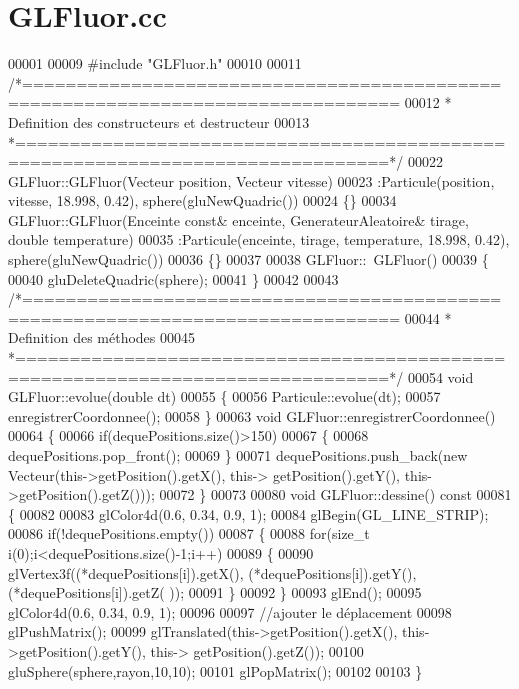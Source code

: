 \section{G\+L\+Fluor.\+cc}
\label{_g_l_fluor_8cc_source}

\begin{DoxyCode}
00001 
00009 \textcolor{preprocessor}{#include "GLFluor.h"}
00010 
00011 \textcolor{comment}{/*================================================================================}
00012 \textcolor{comment}{ * Definition des constructeurs et destructeur}
00013 \textcolor{comment}{ *================================================================================*/}
00022 GLFluor::GLFluor(Vecteur position, Vecteur vitesse)
00023 :Particule(position, vitesse, 18.998, 0.42),  sphere(gluNewQuadric())
00024 \{\}
00034 GLFluor::GLFluor(Enceinte \textcolor{keyword}{const}& enceinte, GenerateurAleatoire& tirage, \textcolor{keywordtype}{double} temperature)
00035 :Particule(enceinte, tirage, temperature, 18.998, 0.42), sphere(gluNewQuadric())
00036 \{\}
00037 
00038 GLFluor::~GLFluor() 
00039 \{ 
00040     gluDeleteQuadric(sphere); 
00041 \}
00042 
00043 \textcolor{comment}{/*================================================================================}
00044 \textcolor{comment}{ * Definition des méthodes }
00045 \textcolor{comment}{ *================================================================================*/}
00054 \textcolor{keywordtype}{void} GLFluor::evolue(\textcolor{keywordtype}{double} dt)
00055 \{
00056     Particule::evolue(dt);
00057     enregistrerCoordonnee();
00058 \}
00063 \textcolor{keywordtype}{void} GLFluor::enregistrerCoordonnee()
00064 \{   
00066     \textcolor{keywordflow}{if}(dequePositions.size()>150)
00067     \{
00068         dequePositions.pop\_front();
00069     \}
00071     dequePositions.push\_back(\textcolor{keyword}{new} Vecteur(this->getPosition().getX(), this->
      getPosition().getY(), this->getPosition().getZ()));
00072 \}
00073 
00080 \textcolor{keywordtype}{void} GLFluor::dessine()\textcolor{keyword}{ const}
00081 \textcolor{keyword}{}\{
00082     
00083     glColor4d(0.6, 0.34, 0.9, 1);
00084     glBegin(GL\_LINE\_STRIP);
00086     \textcolor{keywordflow}{if}(!dequePositions.empty())
00087     \{
00088         \textcolor{keywordflow}{for}(\textcolor{keywordtype}{size\_t} i(0);i<dequePositions.size()-1;i++)
00089         \{
00090             glVertex3f((*dequePositions[i]).getX(), (*dequePositions[i]).getY(), (*dequePositions[i]).getZ(
      ));
00091         \}
00092     \}
00093     glEnd();
00095     glColor4d(0.6, 0.34, 0.9, 1); 
00096     
00097     \textcolor{comment}{//ajouter le déplacement}
00098     glPushMatrix();
00099     glTranslated(this->getPosition().getX(), this->getPosition().getY(), this->
      getPosition().getZ());
00100     gluSphere(sphere,rayon,10,10); 
00101     glPopMatrix();
00102     
00103 \}
\end{DoxyCode}
